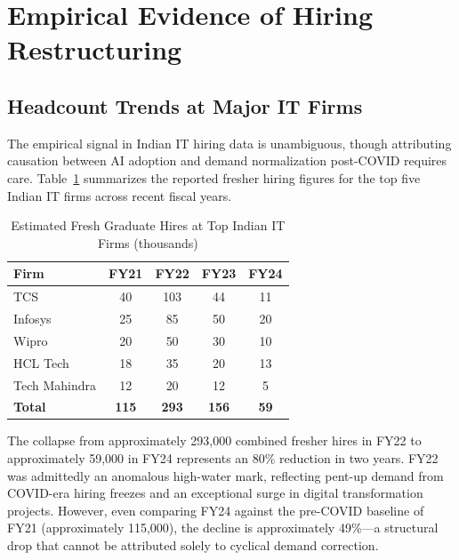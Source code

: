 \documentclass[conference]{IEEEtran}
\begin{document}
\section{Empirical Evidence of Hiring Restructuring}
\label{sec:empirical}

\subsection{Headcount Trends at Major IT Firms}

The empirical signal in Indian IT hiring data is unambiguous, though attributing causation between AI adoption and demand normalization post-COVID requires care. Table~\ref{tab:hiring} summarizes the reported fresher hiring figures for the top five Indian IT firms across recent fiscal years.

\begin{table}[htbp]
\caption{Estimated Fresh Graduate Hires at Top Indian IT Firms (thousands)}
\label{tab:hiring}
\begin{center}
\begin{tabular}{lcccc}
\toprule
\textbf{Firm} & \textbf{FY21} & \textbf{FY22} & \textbf{FY23} & \textbf{FY24} \\
\midrule
TCS           & 40            & 103           & 44            & 11            \\
Infosys       & 25            & 85            & 50            & 20            \\
Wipro         & 20            & 50            & 30            & 10            \\
HCL Tech      & 18            & 35            & 20            & 13            \\
Tech Mahindra & 12            & 20            & 12            & 5             \\
\midrule
\textbf{Total} & \textbf{115} & \textbf{293} & \textbf{156} & \textbf{59}  \\
\bottomrule
\end{tabular}
\end{center}
\end{table}

The collapse from approximately 293,000 combined fresher hires in FY22 to approximately 59,000 in FY24 represents an 80\% reduction in two years. FY22 was admittedly an anomalous high-water mark, reflecting pent-up demand from COVID-era hiring freezes and an exceptional surge in digital transformation projects. However, even comparing FY24 against the pre-COVID baseline of FY21 (approximately 115,000), the decline is approximately 49\%---a structural drop that cannot be attributed solely to cyclical demand correction.
\end{document}

